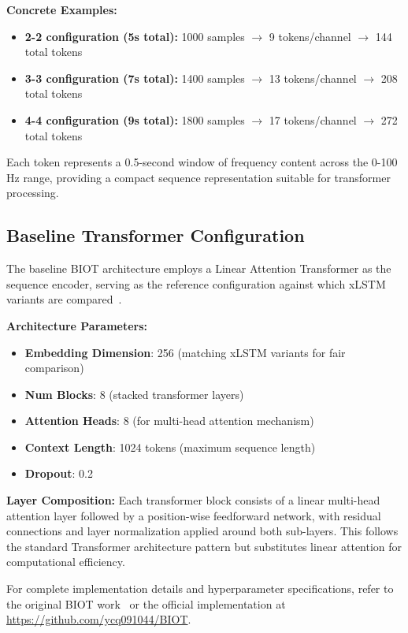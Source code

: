 \textbf{Concrete Examples:}
\begin{itemize}
    \item \textbf{2-2 configuration (5s total):} 1000 samples $\rightarrow$ 9 tokens/channel $\rightarrow$ 144 total tokens
    \item \textbf{3-3 configuration (7s total):} 1400 samples $\rightarrow$ 13 tokens/channel $\rightarrow$ 208 total tokens
    \item \textbf{4-4 configuration (9s total):} 1800 samples $\rightarrow$ 17 tokens/channel $\rightarrow$ 272 total tokens
\end{itemize}

Each token represents a 0.5-second window of frequency content across the 0-100 Hz range, providing a compact sequence representation suitable for transformer processing.

\subsection{Baseline Transformer Configuration}
\label{sec:baseline_transformer_config}

The baseline \ac{BIOT} architecture employs a Linear Attention Transformer as the sequence encoder, serving as the reference configuration against which \ac{xLSTM} variants are compared~\cite{yang2023biot}.

\textbf{Architecture Parameters:}
\begin{itemize}
    \item \textbf{Embedding Dimension}: 256 (matching \ac{xLSTM} variants for fair comparison)
    \item \textbf{Num Blocks}: 8 (stacked transformer layers)
    \item \textbf{Attention Heads}: 8 (for multi-head attention mechanism)
    \item \textbf{Context Length}: 1024 tokens (maximum sequence length)
    \item \textbf{Dropout}: 0.2
\end{itemize}

\textbf{Layer Composition:} Each transformer block consists of a linear multi-head attention layer followed by a position-wise feedforward network, with residual connections and layer normalization applied around both sub-layers. This follows the standard Transformer architecture pattern but substitutes linear attention for computational efficiency.

For complete implementation details and hyperparameter specifications, refer to the original \ac{BIOT} work~\cite{yang2023biot} or the official implementation at \url{https://github.com/ycq091044/BIOT}.

